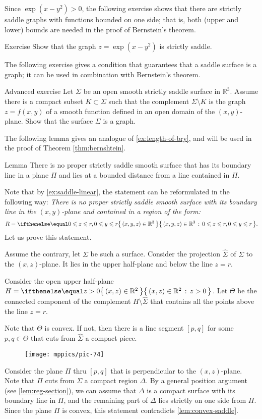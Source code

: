 Since $\exp(x-y^2)>0$,
the following exercise shows that there are strictly saddle graphs with functions bounded on one side;
that is, both (upper and lower) bounds are needed in the proof of Bernstein's theorem.

\begin{thm}{Exercise}\label{ex:one-side-bernshtein}
Show that the graph
$z=\exp(x-y^2)$
is strictly saddle.
\end{thm}

The following exercise gives a condition that guarantees that a saddle surface is a graph;
it can be used in combination with Bernstein's theorem.

\begin{thm}{Advanced exercise}\label{ex:saddle-graph}
Let $\Sigma$ be an open smooth strictly saddle surface in $\mathbb{R}^3$.
Assume there is a compact subset $K\subset \Sigma$ such that the complement $\Sigma\setminus K$ is the graph $z=f(x,y)$ of a smooth function defined in an open domain of the $(x,y)$-plane.
Show that the surface $\Sigma$ is a graph.
\end{thm}

The following lemma gives an analogue of \ref{ex:length-of-bry}, and will be used in the proof of Theorem \ref{thm:bernshtein}.

\begin{thm}{Lemma}\label{lem:region}
There is no proper strictly saddle smooth surface that has its boundary line in a plane $\Pi$ and lies at a bounded distance from a line contained in $\Pi$.
\end{thm}

Note that by \ref{ex:saddle-linear}, the statement can be reformulated in the following way:
\textit{There is no proper strictly saddle smooth surface 
with its boundary line in the $(x,y)$-plane
and contained in a region of the form:}
\[R=\set{(x,y,z)\in\mathbb{R}^3}{0\le z\le r, 0\le y\le r}.   \]
Let us prove this statement.

Assume the contrary, let $\Sigma$ be such a surface.
Consider the projection $\hat \Sigma$ of $\Sigma$ to the $(x,z)$-plane.
It lies in the upper half-plane and below the line $z=r$.

Consider the open upper half-plane $H=\set{(x,z)\in \mathbb{R}^2}{z> 0}$. 
Let $\Theta$ be the connected component of the complement $H\setminus \hat \Sigma$ that contains all the points above the line $z=r$.

Note that $\Theta$ is convex.
If not, then there is a line segment $[p,q]$ for some $p,q\in \Theta$ that cuts from $\hat\Sigma$ a compact piece.
\begin{figure}[!ht]
\vskip-0mm
\centering
\texttt{[image: mppics/pic-74]}
\vskip0mm
\end{figure}
Consider the plane $\Pi$ thru $[p,q]$ that is perpendicular to the $(x,z)$-plane.
Note that $\Pi$ cuts from $\Sigma$ a compact region $\Delta$.
By a general position argument (see \ref{lem:reg-section}),
we can assume that $\Delta$ is a compact surface with its boundary line in $\Pi$, and the remaining part of $\Delta$ lies strictly on one side from $\Pi$.
Since the plane $\Pi$ is convex, this statement contradicts \ref{lem:convex-saddle}.

